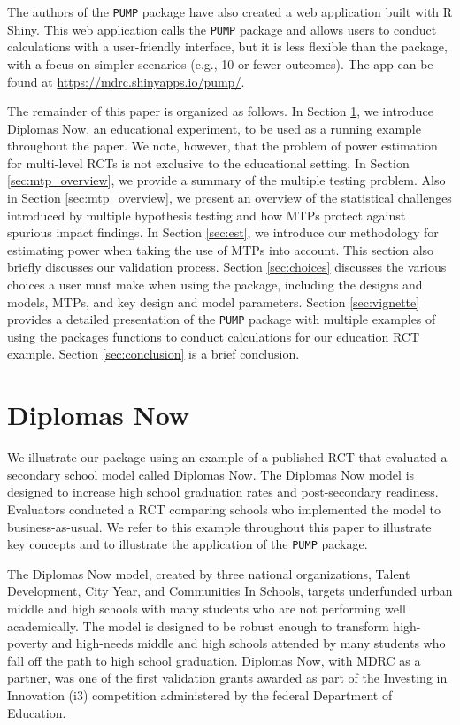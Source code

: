 \documentclass{article}
\begin{document}
The authors of the \texttt{PUMP} package have also created a web
application built with R Shiny. This web application calls the
\texttt{PUMP} package and allows users to conduct calculations with a
user-friendly interface, but it is less flexible than the package, with
a focus on simpler scenarios (e.g., 10 or fewer outcomes). The app can
be found at \url{https://mdrc.shinyapps.io/pump/}.

The remainder of this paper is organized as follows. In Section
\ref{sec:diplomas}, we introduce Diplomas Now, an educational
experiment, to be used as a running example throughout the paper. We
note, however, that the problem of power estimation for multi-level RCTs
is not exclusive to the educational setting. In Section
\ref{sec:mtp_overview}, we provide a summary of the multiple testing
problem. Also in Section \ref{sec:mtp_overview}, we present an overview
of the statistical challenges introduced by multiple hypothesis testing
and how MTPs protect against spurious impact findings. In Section
\ref{sec:est}, we introduce our methodology for estimating power when
taking the use of MTPs into account. This section also briefly discusses
our validation process. Section \ref{sec:choices} discusses the various
choices a user must make when using the package, including the designs
and models, MTPs, and key design and model parameters. Section
\ref{sec:vignette} provides a detailed presentation of the \texttt{PUMP}
package with multiple examples of using the packages functions to
conduct calculations for our education RCT example. Section
\ref{sec:conclusion} is a brief conclusion.

\section{Diplomas Now}
\label{sec:diplomas}

We illustrate our package using an example of a published RCT that
evaluated a secondary school model called Diplomas Now. The Diplomas Now
model is designed to increase high school graduation rates and
post-secondary readiness. Evaluators conducted a RCT comparing schools
who implemented the model to business-as-usual. We refer to this example
throughout this paper to illustrate key concepts and to illustrate the
application of the \texttt{PUMP} package.

The Diplomas Now model, created by three national organizations, Talent
Development, City Year, and Communities In Schools, targets underfunded
urban middle and high schools with many students who are not performing
well academically. The model is designed to be robust enough to
transform high-poverty and high-needs middle and high schools attended
by many students who fall off the path to high school graduation.
Diplomas Now, with MDRC as a partner, was one of the first validation
grants awarded as part of the Investing in Innovation (i3) competition
administered by the federal Department of Education.
\end{document}
